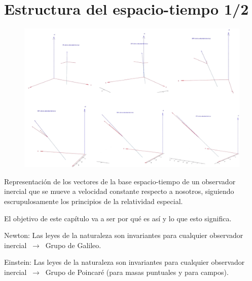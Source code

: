 \chapter{Estructura del espacio-tiempo 1/2}



\vspace{10mm}
\begin{adjustwidth}{50pt}{50pt}
\begin{ejemplo}
\begin{figure}[H]
	\centering
	\includegraphics[width=1\textwidth]{imagenes/img30-01.png}
\end{figure}

Representación de los vectores de la base espacio-tiempo de un observador inercial que se mueve a velocidad constante respecto a nosotros, siguiendo escrupulosamente los principios de la relatividad especial.

El objetivo de este capítulo va a ser por qué es así y lo que esto significa.

\textcolor{gris}{Newton: Las leyes de la naturaleza son invariantes para cualquier observador inercial $\ \to \ $ Grupo de Galileo.}

\textcolor{gris}{Einstein: Las leyes de la naturaleza son invariantes para cualquier observador inercial $\ \to \ $ Grupo de Poincaré (para masas puntuales y para campos).}
\end{ejemplo}
\end{adjustwidth}
\vspace{5mm}

